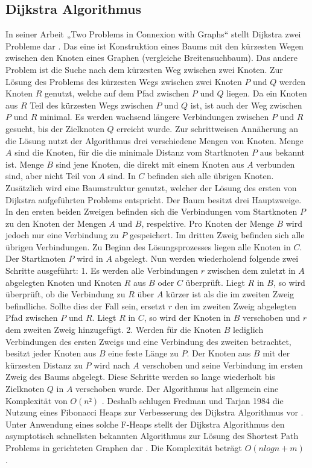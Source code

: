 \subsection{Dijkstra Algorithmus}

In seiner Arbeit „Two Problems in Connexion with Graphs“ stellt Dijkstra zwei Probleme dar \cite{Dijkstra.1959}. Das eine ist Konstruktion eines Baums mit den kürzesten Wegen zwischen den Knoten eines Graphen (vergleiche Breitensuchbaum). Das andere Problem ist die Suche nach dem kürzesten Weg zwischen zwei Knoten.
Zur Lösung des Problems des kürzesten Wegs zwischen zwei Knoten $P$ und $Q$ werden Knoten $R$ genutzt, welche auf dem Pfad zwischen $P$ und $Q$ liegen. Da ein Knoten aus $R$ Teil des kürzesten Wegs zwischen $P$ und $Q$ ist, ist auch der Weg zwischen $P$ und $R$ minimal. Es werden wachsend längere Verbindungen zwischen $P$ und $R$ gesucht, bis der Zielknoten $Q$ erreicht wurde.
Zur schrittweisen Annäherung an die Lösung nutzt der Algorithmus drei verschiedene Mengen von Knoten. Menge $A$ sind die Knoten, für die die minimale Distanz vom Startknoten $P$ aus bekannt ist. Menge $B$ sind jene Knoten, die direkt mit einem Knoten aus $A$ verbunden sind, aber nicht Teil von $A$ sind. In $C$ befinden sich alle übrigen Knoten.
Zusätzlich wird eine Baumstruktur genutzt, welcher der Lösung des ersten von Dijkstra aufgeführten Problems entspricht. Der Baum besitzt drei Hauptzweige. In den ersten beiden Zweigen befinden sich die Verbindungen vom Startknoten $P$ zu den Knoten der Mengen $A$ und $B$, respektive. Pro Knoten der Menge $B$ wird jedoch nur eine Verbindung zu $P$ gespeichert. Im dritten Zweig befinden sich alle übrigen Verbindungen. 
Zu Beginn des Lösungsprozesses liegen alle Knoten in $C$. Der Startknoten $P$ wird in $A$ abgelegt. Nun werden wiederholend folgende zwei Schritte ausgeführt:
1.	Es werden alle Verbindungen $r$ zwischen dem zuletzt in $A$ abgelegten Knoten und Knoten $R$ aus $B$ oder $C$ überprüft. Liegt $R$ in $B$, so wird überprüft, ob die Verbindung zu $R$ über $A$ kürzer ist als die im zweiten Zweig befindliche. Sollte dies der Fall sein, ersetzt $r$ den im zweiten Zweig abgelegten Pfad zwischen $P$ und $R$. Liegt $R$ in $C$, so wird der Knoten in $B$ verschoben und $r$ dem zweiten Zweig hinzugefügt.
2.	Werden für die Knoten $B$ lediglich Verbindungen des ersten Zweigs und eine Verbindung des zweiten betrachtet, besitzt jeder Knoten aus $B$ eine feste Länge zu $P$. Der Knoten aus $B$ mit der kürzesten Distanz zu $P$ wird nach $A$ verschoben und seine Verbindung im ersten Zweig des Baums abgelegt.
Diese Schritte werden so lange wiederholt bis Zielknoten $Q$ in $A$ verschoben wurde.
Der Algorithmus hat allgemein eine Komplexität von $O(n²)$ \cite{Madkour.2017}. Deshalb schlugen Fredman und Tarjan 1984 die Nutzung eines Fibonacci Heaps zur Verbesserung des Dijkstra Algorithmus vor \cite{Fredman.1987}. Unter Anwendung eines solche F-Heaps stellt der Dijkstra Algorithmus den asymptotisch schnellsten bekannten Algorithmus zur Lösung des Shortest Path Problems in gerichteten Graphen dar \cite{Schmitz.2019}.  Die Komplexität beträgt $O(n log n + m)$ \cite{Madkour.2017}. 



